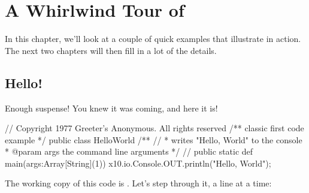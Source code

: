 \chapter{A Whirlwind Tour of \Xten{}}
In this chapter, we'll look at a couple of quick examples that illustrate
\Xten{} in action. The next two chapters will then fill in a lot of the details.
\section{Hello!}

Enough suspense! You knew it was coming, and here it is!
\begin{xtennum}[]
// Copyright 1977 Greeter's Anonymous. All rights reserved 
/** classic first code example */ 
public class HelloWorld { 
   /** //
    * writes "Hello, World" to the console 
    * @param args the command line arguments 
    */ //
   public static def main(args:Array[String](1)) { 
      x10.io.Console.OUT.println("Hello, World"); 
   }
}
\end{xtennum}
The working copy of this code is 
\href{http://dist.codehaus.org/x10/documentation/guide/src/hello/HelloWorld.x10}{}.
Let's step through it, a line at a time:

